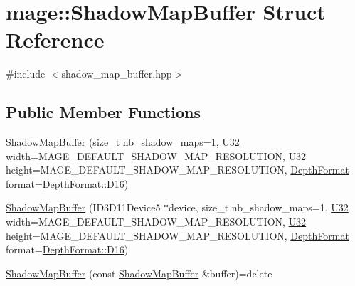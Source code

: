 \hypertarget{structmage_1_1_shadow_map_buffer}{}\section{mage\+:\+:Shadow\+Map\+Buffer Struct Reference}
\label{structmage_1_1_shadow_map_buffer}


{\ttfamily \#include $<$shadow\+\_\+map\+\_\+buffer.\+hpp$>$}

\subsection*{Public Member Functions}
\begin{DoxyCompactItemize}
\item 
\hyperlink{structmage_1_1_shadow_map_buffer_a9e8d08d9e1ddaf95bfe5ea759df28b45}{Shadow\+Map\+Buffer} (size\+\_\+t nb\+\_\+shadow\+\_\+maps=1, \hyperlink{namespacemage_a41c104c036fba3756a74e19f793eeaa1}{U32} width=M\+A\+G\+E\+\_\+\+D\+E\+F\+A\+U\+L\+T\+\_\+\+S\+H\+A\+D\+O\+W\+\_\+\+M\+A\+P\+\_\+\+R\+E\+S\+O\+L\+U\+T\+I\+ON, \hyperlink{namespacemage_a41c104c036fba3756a74e19f793eeaa1}{U32} height=M\+A\+G\+E\+\_\+\+D\+E\+F\+A\+U\+L\+T\+\_\+\+S\+H\+A\+D\+O\+W\+\_\+\+M\+A\+P\+\_\+\+R\+E\+S\+O\+L\+U\+T\+I\+ON, \hyperlink{namespacemage_aed4c3f883a30484d0a20762c06be81d4}{Depth\+Format} format=\hyperlink{namespacemage_aed4c3f883a30484d0a20762c06be81d4a6fd9ec81643ee5a57f85a71951bfe13d}{Depth\+Format\+::\+D16})
\item 
\hyperlink{structmage_1_1_shadow_map_buffer_a585ece0dc3175a14f7080de85b1c8fae}{Shadow\+Map\+Buffer} (I\+D3\+D11\+Device5 $\ast$device, size\+\_\+t nb\+\_\+shadow\+\_\+maps=1, \hyperlink{namespacemage_a41c104c036fba3756a74e19f793eeaa1}{U32} width=M\+A\+G\+E\+\_\+\+D\+E\+F\+A\+U\+L\+T\+\_\+\+S\+H\+A\+D\+O\+W\+\_\+\+M\+A\+P\+\_\+\+R\+E\+S\+O\+L\+U\+T\+I\+ON, \hyperlink{namespacemage_a41c104c036fba3756a74e19f793eeaa1}{U32} height=M\+A\+G\+E\+\_\+\+D\+E\+F\+A\+U\+L\+T\+\_\+\+S\+H\+A\+D\+O\+W\+\_\+\+M\+A\+P\+\_\+\+R\+E\+S\+O\+L\+U\+T\+I\+ON, \hyperlink{namespacemage_aed4c3f883a30484d0a20762c06be81d4}{Depth\+Format} format=\hyperlink{namespacemage_aed4c3f883a30484d0a20762c06be81d4a6fd9ec81643ee5a57f85a71951bfe13d}{Depth\+Format\+::\+D16})
\item 
\hyperlink{structmage_1_1_shadow_map_buffer_a276a32f787cda940ac36df461d0ce3ea}{Shadow\+Map\+Buffer} (const \hyperlink{structmage_1_1_shadow_map_buffer}{Shadow\+Map\+Buffer} \&buffer)=delete
\item 

\end{DoxyCompactItemize}
